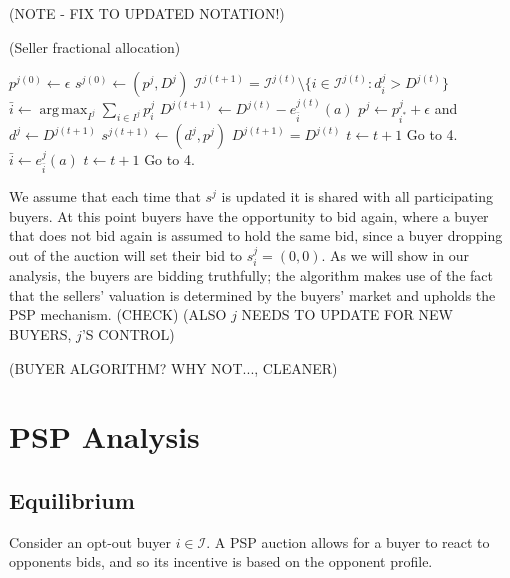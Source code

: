 \documentclass[12pt]{article}
\theoremstyle{definition}
\newcommand{\mcI}{\mathcal{I}}
\DeclareMathOperator*{\argmax}{arg\,max}
\begin{document}
\begin{multicols}{2}
(NOTE - FIX TO UPDATED NOTATION!)
\begin{algorithm}[H]
\caption{(Seller fractional allocation)}
\begin{algorithmic}[1]
\State $p^{j(0)} \gets \epsilon$
\State $s^{j(0)} \gets (p^j, D^j)$
\State $\mcI^{j(t+1)} = \mcI^{j(t)}\setminus \lbrace i \in \mcI^{j(t)}: d_i^j >
D^{j(t)}\rbrace$
\State $ \bar{i} \gets \displaystyle\argmax_{I^j}\sum_{i\in I^j} p_i^j$ 
\State $D^{j(t+1)} \gets D^{j(t)} - e_{\bar{i}}^{j(t)}(a)$
\State $p^j \gets p_{i^*}^j+\epsilon$ and $d^j \gets D^{j(t+1)}$
\State $s^{j(t+1)} \gets (d^j, p^j)$
\State $D^{j(t+1)} = D^{j(t)}$
\State $t \gets t+1$
\State Go to 4.
\Else
\State $\bar{i} \gets e_{\bar{i}}^j(a)$
\State $t \gets t+1$
\State Go to 4.
\EndIf
\EndWhile
\end{algorithmic}
\end{algorithm}
We assume that each time that $s^j$ is updated it is shared with all
participating buyers. At this point buyers have the opportunity to bid again,
where a buyer that does not bid again is assumed to hold the same bid, since a
buyer dropping out of the auction will set their bid to $s_i^j=(0,0)$. As we will show in our analysis, the buyers are bidding truthfully; the
algorithm makes use of the fact that the sellers' valuation is determined by
the buyers' market and upholds the PSP mechanism. (CHECK) (ALSO $j$ NEEDS TO
UPDATE FOR NEW BUYERS, $j$'S CONTROL)

(BUYER ALGORITHM? WHY NOT..., CLEANER)

\section{PSP Analysis}\label{analysis}
\subsection{Equilibrium}

Consider an opt-out buyer $i\in\mcI$. A PSP auction
allows for a buyer to react to opponents bids, and so its incentive is based on
the opponent profile.


\end{multicols}
\end{document}
